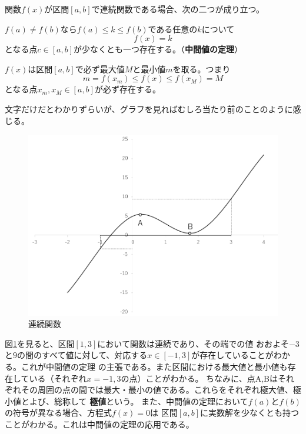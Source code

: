 \documentclass[a4j,dvipdfmx]{jsarticle}
\begin{document}
                関数$f(x)$が区間$[a,b]$で連続関数である場合、次の二つが成り立つ。
                \begin{screen}
                    $f(a)\neq f(b)$なら$f(a)\leq k \leq f(b)$である任意の$k$について
                    \begin{equation*}
                        f(x)=k
                    \end{equation*}
                    となる点$c\in[a,b]$が少なくとも一つ存在する。（\textbf{中間値の定理}）
                \end{screen}
                \begin{screen}
                    $f(x)$は区間$[a,b]$で必ず最大値$M$と最小値$m$を取る。つまり
                    \begin{equation*}
                        m=f(x_m)\leq f(x)\leq f(x_M)=M
                    \end{equation*}
                    となる点$x_m,x_M\in[a,b]$が必ず存在する。
                \end{screen}
                文字だけだとわかりずらいが、グラフを見ればむしろ当たり前のことのように感じる。
                \begin{figure}[h]
                    \centering
                    \includegraphics[keepaspectratio,scale=0.3]{img/QuuNote/ContinuousFuncGraph.png}
                    \caption{連続関数}\label{fig:連続関数,中間値の定理,最大最小}
                \end{figure}

                図\ref{fig:連続関数,中間値の定理,最大最小}を見ると、区間$[1,3]$において関数は連続であり、その端での値
                おおよそ$-3$と$9$の間のすべて値に対して、対応する$x\in[-1,3]$が存在していることがわかる。これが中間値の定理
                の主張である。また区間における最大値と最小値も存在している（それぞれ$x=-1,3$の点）ことがわかる。
                ちなみに、点A,Bはそれぞれその周囲の点の間では最大・最小の値である。これらをそれぞれ極大値、極小値とよび、総称して
                \textbf{極値}という。
                \newpage
                また、中間値の定理において$f(a)$と$f(b)$の符号が異なる場合、方程式$f(x)=0$は
                区間$[a,b]$に実数解を少なくとも持つことがわかる。これは中間値の定理の応用である。
\end{document}
